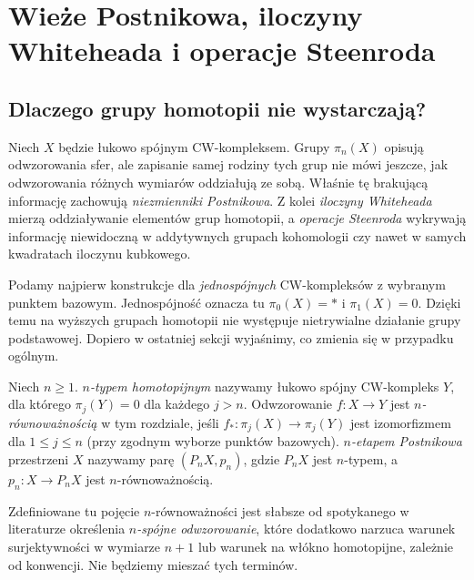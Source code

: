 \chapter[Wieże Postnikowa i operacje Steenroda]{Wieże Postnikowa, iloczyny Whiteheada i operacje Steenroda}
\label{ch:postnikow-v7}

\section{Dlaczego grupy homotopii nie wystarczają?}
Niech $X$ będzie łukowo spójnym CW-kompleksem. Grupy
$\pi_n(X)$ opisują odwzorowania sfer, ale zapisanie samej
rodziny tych grup nie mówi jeszcze, jak odwzorowania
różnych wymiarów oddziałują ze sobą. Właśnie tę brakującą
informację zachowują \emph{niezmienniki Postnikowa}. Z kolei
\emph{iloczyny Whiteheada} mierzą oddziaływanie elementów
grup homotopii, a \emph{operacje Steenroda} wykrywają
informację niewidoczną w addytywnych grupach kohomologii
czy nawet w samych kwadratach iloczynu kubkowego.

Podamy najpierw konstrukcje dla \emph{jednospójnych}
CW-kompleksów z wybranym punktem bazowym. Jednospójność
oznacza tu $\pi_0(X)=*$ i $\pi_1(X)=0$. Dzięki temu
na wyższych grupach homotopii nie występuje nietrywialne
działanie grupy podstawowej. Dopiero w ostatniej sekcji
wyjaśnimy, co zmienia się w przypadku ogólnym.

\begin{definicja}
Niech $n\ge1$. \emph{$n$-typem homotopijnym} nazywamy
łukowo spójny CW-kompleks $Y$, dla którego $\pi_j(Y)=0$
dla każdego $j>n$. Odwzorowanie $f:X\to Y$ jest
\emph{$n$-równoważnością} w tym rozdziale, jeśli
$f_*:\pi_j(X)\to\pi_j(Y)$ jest izomorfizmem dla
$1\le j\le n$ (przy zgodnym wyborze punktów bazowych).
\emph{$n$-etapem Postnikowa} przestrzeni $X$ nazywamy
parę $(P_nX,p_n)$, gdzie $P_nX$ jest $n$-typem,
a $p_n:X\to P_nX$ jest $n$-równoważnością.
\end{definicja}

\begin{uwaga}
Zdefiniowane tu pojęcie $n$-równoważności jest słabsze
od spotykanego w literaturze określenia \emph{$n$-spójne odwzorowanie},
które dodatkowo narzuca warunek surjektywności w wymiarze
$n+1$ lub warunek na włókno homotopijne, zależnie od
konwencji. Nie będziemy mieszać tych terminów.
\end{uwaga}

